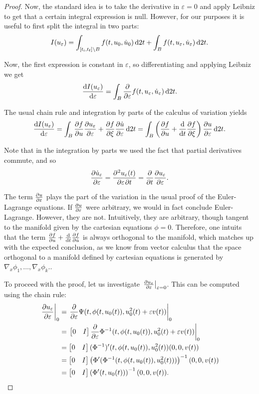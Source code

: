 \documentclass{article}
\theoremstyle{plain}
\theoremstyle{plain}
\theoremstyle{nonumberplain}
\newtheorem{proof}{Dem}
\theoremstyle{empty}
\newcommand{\tstart}{\mathrm{i}}
\newcommand{\tend}{\mathrm{f}}
\DeclarePairedDelimiter\eval{.}{\rvert}
\begin{document}
\begin{proof}
Now, the standard idea is to take the derivative in $\varepsilon = 0$ and apply Leibniz to get that a certain integral expression is null. However, for our purposes it is useful to first split the integral in two parts:
\[I(u_\varepsilon) = \int_{[t_\tstart,t_\tend] \setminus B} f(t,u_0,\dot u_0) \dl2 t + \int_B f(t,u_\varepsilon, \dot u_\varepsilon) \dl2 t.\]

Now, the first expression is constant in $\varepsilon$, so differentiating and applying Leibniz we get
\[\diff{I(u_\varepsilon)}\varepsilon = \int_B \diffp*{f(t,u_\varepsilon, \dot u_\varepsilon)}\varepsilon \dl2 t.\]

The usual chain rule and integration by parts of the calculus of variation yields
\[
\diff{I(u_\varepsilon)}\varepsilon = \int_B \diffp f u \diffp{u_\varepsilon}\varepsilon + \diffp f {\xi} \diffp{\dot u}\varepsilon \dl2 t = \int_B \left( \diffp f u + \diff*{\diffp f {\xi}}t \right) \diffp{u}\varepsilon \dl2 t.
\]

Note that in the integration by parts we used the fact that partial derivatives commute, and so
\[\diffp{\dot u_\varepsilon}\varepsilon = \diffp{u_\varepsilon(t)}{\varepsilon,t} = \diffp*{\diffp {u_\varepsilon} \varepsilon}t.\]

The term $\diffp u \varepsilon$ plays the part of the variation in the usual proof of the Euler-Lagrange equations. If $\diffp u \varepsilon$ were arbitrary, we would in fact conclude Euler-Lagrange. However, they are not. Intuitively, they are arbitrary, though tangent to the manifold given by the cartesian equations $\phi = 0$. Therefore, one intuits that the term $\diffp f u + \diff*{\diffp f {\dot u}}t$ is always orthogonal to the manifold, which matches up with the expected conclusion, as we know from vector calculus that the space orthogonal to a manifold defined by cartesian equations is generated by $\nabla_x \phi_1, \dots, \nabla_x \phi_k$..

To proceed with the proof, let us investigate $\eval*{\diffp {u_\varepsilon} \varepsilon}_{\varepsilon = 0}$. This can be computed using the chain rule:
\begin{align*}
\eval*{\diffp {u_\varepsilon} \varepsilon}_0 &= \eval*{\diffp*{\Psi(t, \phi(t,u_0(t)), u_0^2(t) + \varepsilon v(t))} \varepsilon}_0\\
&= \eval*{\begin{bmatrix} 0 & I \end{bmatrix} \diffp*{\Phi^{-1}(t, \phi(t,u_0(t)), u_0^2(t) + \varepsilon v(t))} \varepsilon}_0\\
&= \begin{bmatrix} 0 & I \end{bmatrix} (\Phi^{-1})'(t, \phi(t,u_0(t)), u_0^2(t)) (0, 0, v(t))\\
&= \begin{bmatrix} 0 & I \end{bmatrix} \left(\Phi'(\Phi^{-1}(t, \phi(t,u_0(t)), u_0^2(t)))\right)^{-1} (0,0,v(t))\\
&= \begin{bmatrix} 0 & I \end{bmatrix} \left( \Phi'(t, u_0(t)) \right)^{-1} (0,0,v(t)).
\end{align*}


\end{proof}
\end{document}
